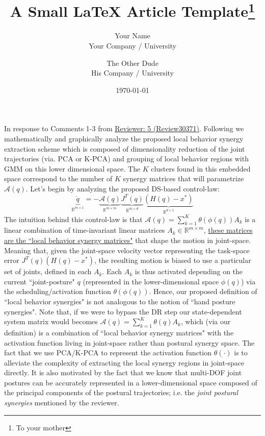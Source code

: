 \documentclass{article}
\title{A Small \LaTeX{} Article Template\thanks{To your mother}}
\author{Your Name  \\
	Your Company / University  \\
	\and 
	The Other Dude \\
	His Company / University \\
	}
\date{\today}
\begin{document}
\vspace{-10pt}
In response to Comments 1-3 from \underline{Reviewer: 5 (Review30371)}. Following we mathematically and graphically analyze the proposed local behavior synergy extraction scheme which is composed of dimensionality reduction of the joint trajectories (via. PCA or K-PCA) and grouping of local behavior regions with GMM on this lower dimensional space. The $K$ clusters found in this embedded space correspond to the number of $K$ synergy matrices that will parametrize $\mathcal{A}(q)$. Let's begin by analyzing the proposed DS-based control-law:
\begin{equation}
\underbrace{\dot{q}}_{\mathbb{R}^{m\times 1}} = -\underbrace{\mathcal{A}(q)}_{\mathbb{R}^{m\times m}}\underbrace{J^{T}(q)}_{\mathbb{R}^{m\times d}}\underbrace{(H(q)-x^*)}_{\mathbb{R}^{d\times 1}}
\label{eq:jtds}
\end{equation}
The intuition behind this control-law is that $\mathcal{A}(q) = \sum\limits_{k=1}^{K}\theta(\phi(q))A_k$ is a linear combination of time-invariant linear matrices $A_k \in \mathbb{R}^{m \times m}$, \underline{these matrices are the ``local behavior synergy matrices"} that shape the motion in joint-space. Meaning that, given the joint-space velocity vector representing the task-space error $J^{T}(q)(H(q)-x^*)$, the resulting motion is biased to use a particular set of joints, defined in each $A_k$. Each $A_k$ is thus activated depending on the current ``joint-posture" $q$ (represented in the lower-dimensional space $\phi(q)$) via the scheduling/activation function $\theta(\phi(q))$. Hence, our proposed definition of ``local behavior synergies" is not analogous to the notion of ``hand posture synergies". Note that, if we were to bypass the DR step our state-dependent system matrix would becomes $\mathcal{A}(q)= \sum\limits_{k=1}^{K}\theta(q)A_k$, which (via our definition) is a combination of ``local behavior synergy matrices" with the activation function living in joint-space rather than postural synergy space. The fact that we use PCA/K-PCA to represent the activation function $\theta(\cdot)$ is to alleviate the complexity of extracting the local synergy regions in joint-space directly. It is also motivated by the fact that we know that multi-DOF joint postures can be accurately represented in a lower-dimensional space composed of the principal components of the postural trajectories; i.e. the \textit{joint postural synergies} mentioned by the reviewer. 
\end{document}
